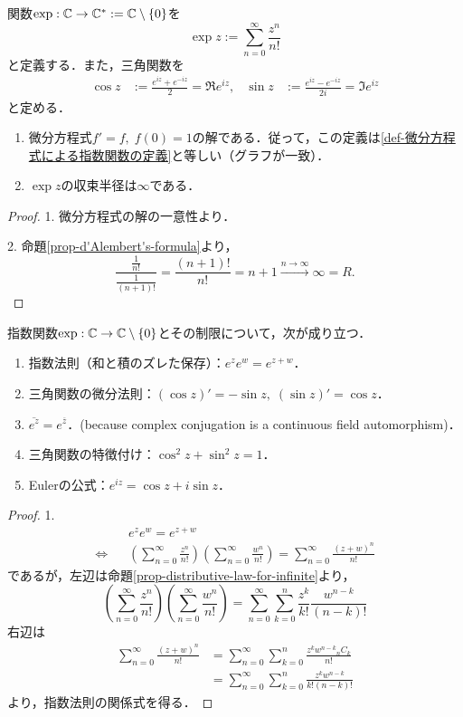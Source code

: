 \documentclass[uplatex, dvipdfmx]{jsreport}
\begin{document}
\begin{definition}
    関数$\exp:\mathbb{C}\to\mathbb{C}^*:=\mathbb{C}\setminus\{0\}$を
    \[ \exp z:=\sum^\infty_{n=0}\frac{z^n}{n!} \]
    と定義する．また，三角関数を
    \begin{align*}
        \cos z&:=\frac{e^{iz}+e^{-iz}}{2}=\Re e^{iz},&\sin z&:=\frac{e^{iz}-e^{-iz}}{2i}=\Im e^{iz}
    \end{align*}
    と定める．
\end{definition}
\begin{lemma}\mbox{}
    \begin{enumerate}
        \item 微分方程式$f'=f,\;f(0)=1$の解である．従って，この定義は\ref{def-微分方程式による指数関数の定義}と等しい（グラフが一致）．
        \item $\exp z$の収束半径は$\infty$である．
    \end{enumerate}
\end{lemma}
\begin{proof}
    1. 微分方程式の解の一意性より．

    2. 命題\ref{prop-d'Alembert's-formula}より，
    \[\frac{\frac{1}{n!}}{\frac{1}{(n+1)!}}=\frac{(n+1)!}{n!}=n+1\xrightarrow{n\to\infty}\infty=R.\]
\end{proof}

\begin{proposition}
    指数関数$\exp:\mathbb{C}\to\mathbb{C}\setminus\{0\}$とその制限について，次が成り立つ．
    \begin{enumerate}
        \item 指数法則（和と積のズレた保存）：$e^ze^w=e^{z+w}$．
        \item 三角関数の微分法則：$(\cos z)'=-\sin z,\;(\sin z)'=\cos z$．
        \item $\overline{e^z}=e^{\overline{z}}$．(because complex conjugation is a continuous field automorphism)．
        \item 三角関数の特徴付け：$\cos^2z+\sin^2z=1$．
        \item Eulerの公式：$e^{iz}=\cos z+i\sin z$．
    \end{enumerate}
\end{proposition}
\begin{proof}
    1. \begin{align*}
        &e^ze^w=e^{z+w}\\ \Leftrightarrow\;\;\;&\left(\sum^\infty_{n=0}\frac{z^n}{n!}\right)\left(\sum^\infty_{n=0}\frac{w^n}{n!}\right)=\sum^\infty_{n=0}\frac{(z+w)^n}{n!}
    \end{align*}
    であるが，左辺は命題\ref{prop-distributive-law-for-infinite}より，
    \[ \left(\sum^\infty_{n=0}\frac{z^n}{n!}\right)\left(\sum^\infty_{n=0}\frac{w^n}{n!}\right) = \sum^\infty_{n=0}\sum^n_{k=0}\frac{z^k}{k!}\frac{w^{n-k}}{(n-k)!} \]
    右辺は
    \begin{align*}
        \sum^\infty_{n=0}\frac{(z+w)^n}{n!} &= \sum^\infty_{n=0}\sum^n_{k=0}\frac{z^kw^{n-k}{}_nC_k}{n!}\\
        &= \sum^\infty_{n=0}\sum^n_{k=0}\frac{z^kw^{n-k}}{k!(n-k)!}
    \end{align*}
    より，指数法則の関係式を得る．
\end{proof}
\end{document}
